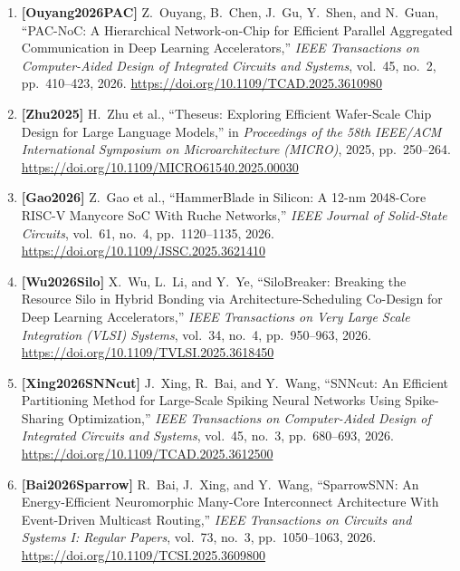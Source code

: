\begin{enumerate}
    \item \textbf{[Ouyang2026PAC]} Z.~Ouyang, B.~Chen, J.~Gu, Y.~Shen, and N.~Guan, ``PAC-NoC: A Hierarchical Network-on-Chip for Efficient Parallel Aggregated Communication in Deep Learning Accelerators,'' \emph{IEEE Transactions on Computer-Aided Design of Integrated Circuits and Systems}, vol.~45, no.~2, pp.~410--423, 2026. \url{https://doi.org/10.1109/TCAD.2025.3610980}
    \item \textbf{[Zhu2025]} H.~Zhu et al., ``Theseus: Exploring Efficient Wafer-Scale Chip Design for Large Language Models,'' in \emph{Proceedings of the 58th IEEE/ACM International Symposium on Microarchitecture (MICRO)}, 2025, pp.~250--264. \url{https://doi.org/10.1109/MICRO61540.2025.00030}
    \item \textbf{[Gao2026]} Z.~Gao et al., ``HammerBlade in Silicon: A 12-nm 2048-Core RISC-V Manycore SoC With Ruche Networks,'' \emph{IEEE Journal of Solid-State Circuits}, vol.~61, no.~4, pp.~1120--1135, 2026. \url{https://doi.org/10.1109/JSSC.2025.3621410}
    \item \textbf{[Wu2026Silo]} X.~Wu, L.~Li, and Y.~Ye, ``SiloBreaker: Breaking the Resource Silo in Hybrid Bonding via Architecture-Scheduling Co-Design for Deep Learning Accelerators,'' \emph{IEEE Transactions on Very Large Scale Integration (VLSI) Systems}, vol.~34, no.~4, pp.~950--963, 2026. \url{https://doi.org/10.1109/TVLSI.2025.3618450}
    \item \textbf{[Xing2026SNNcut]} J.~Xing, R.~Bai, and Y.~Wang, ``SNNcut: An Efficient Partitioning Method for Large-Scale Spiking Neural Networks Using Spike-Sharing Optimization,'' \emph{IEEE Transactions on Computer-Aided Design of Integrated Circuits and Systems}, vol.~45, no.~3, pp.~680--693, 2026. \url{https://doi.org/10.1109/TCAD.2025.3612500}
    \item \textbf{[Bai2026Sparrow]} R.~Bai, J.~Xing, and Y.~Wang, ``SparrowSNN: An Energy-Efficient Neuromorphic Many-Core Interconnect Architecture With Event-Driven Multicast Routing,'' \emph{IEEE Transactions on Circuits and Systems I: Regular Papers}, vol.~73, no.~3, pp.~1050--1063, 2026. \url{https://doi.org/10.1109/TCSI.2025.3609800}
\end{enumerate}
